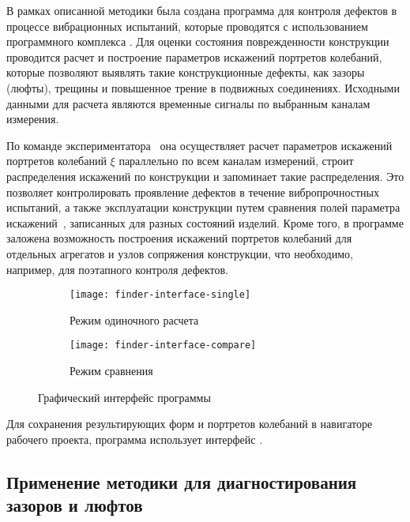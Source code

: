 В рамках описанной методики была создана программа для контроля дефектов в процессе вибрационных испытаний, которые проводятся с использованием программного комплекса . Для оценки состояния поврежденности конструкции проводится расчет и построение параметров искажений портретов колебаний, которые позволяют выявлять такие конструкционные дефекты, как зазоры (люфты), трещины и повышенное трение в подвижных соединениях. Исходными данными для расчета являются временные сигналы по выбранным каналам измерения. 

По команде экспериментатора~ она осуществляет расчет параметров искажений портретов колебаний $ \xi $ параллельно по всем каналам измерений, строит распределения искажений по конструкции и запоминает такие распределения. Это позволяет контролировать проявление дефектов в течение вибропрочностных испытаний, а также эксплуатации конструкции путем сравнения полей параметра искажений~, записанных для разных состояний изделий. Кроме того, в программе заложена возможность построения искажений портретов колебаний для отдельных агрегатов и узлов сопряжения конструкции, что необходимо, например, для поэтапного контроля дефектов.

\def\sfDefects{0.49\textwidth}

\begin{figure}[!htb]
	\centering
	\begin{subfigure}[t]{\sfDefects}
		\texttt{[image: finder-interface-single]}
		\caption{Режим одиночного расчета} \label{subfig:finder-interface-single}
	\end{subfigure}
	\hfill
	\begin{subfigure}[t]{\sfDefects}
		\texttt{[image: finder-interface-compare]} 
		\caption{Режим сравнения} \label{subfig:finder-interface-compare}
	\end{subfigure}
    \caption{Графический интерфейс программы} 
\end{figure}

Для сохранения результирующих форм и портретов колебаний в навигаторе рабочего проекта, программа использует интерфейс .

\subsection{Применение методики для диагностирования зазоров и люфтов}

